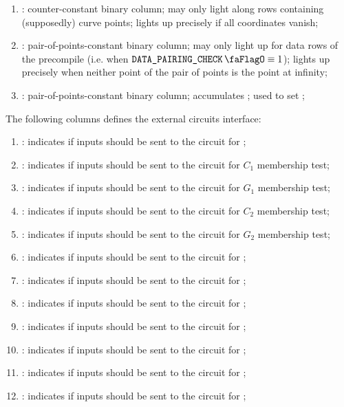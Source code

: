 \begin{enumerate}[resume]
    \item
        \isInfinity:
        counter-constant binary column;
        may only light along rows containing (supposedly) curve points;
        lights up precisely if all coordinates vanish;
    \item
        \both{\nontrivialPairOfPointsBit}:
        pair-of-points-constant binary column;
        may only light up for data rows of the  precompile (i.e. when $\isBlsPairingCheckData \equiv 1$);
        lights up precisely when neither point of the pair of points is the point at infinity;
    \item
        \both{\nontrivialPairOfPointsAcc}:
        pair-of-points-constant binary column;
        accumulates \nontrivialPairOfPointsBit{};
        used to set \wellformedDataNontrivial{};
\end{enumerate}
The following columns defines the external circuits interface:
\begin{enumerate}[resume]
    \item
        \both{\csPointEvaluation}:
        indicates if inputs should be sent to the circuit for ;
    \item
        \both{\csCOne}:
        indicates if inputs should be sent to the circuit for $C_1$ membership test;
    \item
        \both{\csGOne}:
        indicates if inputs should be sent to the circuit for $G_1$ membership test;
    \item
        \both{\csCTwo}:
        indicates if inputs should be sent to the circuit for $C_2$ membership test;
    \item
        \both{\csGTwo}:
        indicates if inputs should be sent to the circuit for $G_2$ membership test;
    \item
        \both{\csPairing}:
        indicates if inputs should be sent to the circuit for ;
    \item
        \both{\csGOneAdd}:
        indicates if inputs should be sent to the circuit for ;
    \item
        \both{\csGTwoAdd}:
        indicates if inputs should be sent to the circuit for ;
    \item
        \both{\csGOneMsm}:
        indicates if inputs should be sent to the circuit for ;
    \item
        \both{\csGTwoMsm}:
        indicates if inputs should be sent to the circuit for ;
    \item
        \both{\csMapFpToGOne}:
        indicates if inputs should be sent to the circuit for ;
    \item
        \both{\csMapFpTwoToGTwo}:
        indicates if inputs should be sent to the circuit for ;
\end{enumerate}
